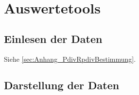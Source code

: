 \chapter{Auswertetools}
\label{ch:Auswertetools}

\section{Einlesen der Daten}
\label{sec:Auswertetools_EinlesenDaten}
Siehe \ref{sec:Anhang_PdivRpdivBestimmung}.


\section{Darstellung der Daten}
\label{sec:Auswetetools_DarstellungDaten}



